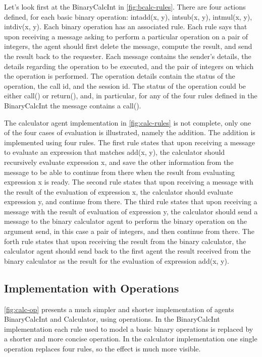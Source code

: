 \documentclass[a4paper,12pt,oneside,fleqn]{book} %
\begin{document}
Let's look first at the BinaryCalcInt in \autoref{fig:bcalc-rules}. There
are four actions defined, for each basic binary operation: intadd(x, y),
intsub(x, y), intmul(x, y), intdiv(x, y). Each binary operation has an
associated rule. Each rule says that upon receiving a message asking to
perform a particular operation on a pair of integers, the agent should
first delete the message, compute the result, and send the result back to
the requester.  Each message contains the sender's details, the details
regarding the operation to be executed, and the pair of integers on which
the operation is performed. The operation details contain the status of the
operation, the call id, and the session id. The status of the operation
could be either call() or return(), and, in particular, for any of the four
rules defined in the BinaryCalcInt the message contains a call().

The calculator agent implementation in \autoref{fig:calc-rules} is not
complete, only one of the four cases of evaluation is illustrated, namely
the addition. The addition is implemented using four rules. The first rule
states that upon receiving a message to evaluate an expression that matches
add(x, y), the calculator should recursively evaluate expression x, and save
the other information from the message to be able to continue from there when
the result from evaluating expression x is ready. The second rule states
that upon receiving a message with the result of the evaluation of
expression x, the calculator should evaluate expression y, and continue
from there. The third rule states that upon receiving a message with the
result of evaluation of expression y, the calculator should send a message
to the binary calculator agent to perform the binary operation on the
argument send, in this case a pair of integers, and then continue from
there. The forth rule states that upon receiving the result from the
binary calculator, the calculator agent should send back to the first agent
the result received from the binary calculator as the result for the
evaluation of expression add(x, y).
\subsection{Implementation with Operations} %
\autoref{fig:calc-op} presents a much simpler and shorter implementation of
agents BinaryCalcInt and Calculator, using operations. In the BinaryCalcInt
implementation each rule used to model a basic binary operations is
replaced by a shorter and more concise operation. In the calculator
implementation one single operation replaces four rules, so the effect is
much more visible.
\end{document}
